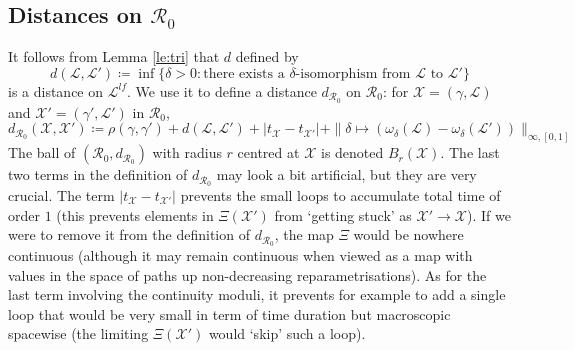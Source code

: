 \documentclass[11pt]{article}
\def\Conf{{\mathscr{R}}}
\def\Att{{\Xi}}
\begin{document}
\subsection{Distances on \texorpdfstring{$\Conf_0$}{R0}}
\label{sub:d}
It follows from Lemma \ref{le:tri} that $d$ defined by
\begin{equation}
 \label{eq:def:dist}
d( \mathcal{L},\mathcal{L}'  )\coloneqq
\inf \{\delta>0: \mbox{there exists a $\delta$-isomorphism from $\mathcal{L}$ to $\mathcal{L}'$}\}
\end{equation}
is a distance on $\mathscr{L}^{lf}$.
%
We use it to define a distance $d_{\Conf_0}$ on $\Conf_0$: for $\mathcal{X}=(\gamma, \mathcal{L})$ and $\mathcal{X}'=(\gamma', \mathcal{L}')$ in $\Conf_0$,
\[
d_{\Conf_0}(\mathcal{X},\mathcal{X}' )\coloneqq \rho(\gamma,\gamma')+
d( \mathcal{L},\mathcal{L}'  )+|t_{\mathcal{X}}-t_{\mathcal{X}'} |+\| \delta\mapsto (\omega_\delta(\mathcal{L})-\omega_ \delta(\mathcal{L}'))\|_{\infty,[0,1]}
\]
The ball of $(\Conf_0,d_{\Conf_0})$ with radius $r$ centred at $\mathcal{X}$ is denoted $B_r(\mathcal{X})$.
The last two terms in the definition of $d_{\Conf_0}$ may look a bit artificial, but they are very crucial. The term $|t_{\mathcal{X}}-t_{\mathcal{X}'} |$ prevents the small loops to accumulate total time of order $1$ (this prevents elements in $\Att(\mathcal{X}')$ from `getting stuck' as $\mathcal{X}'\to \mathcal{X}$). If we were to remove it from the definition of $d_{\Conf_0}$, the map $\Att$ would be nowhere continuous (although it may remain continuous when viewed as a map with values in the space of paths up non-decreasing reparametrisations). As for the last term involving the continuity moduli, it prevents for example to add a single loop that would be very small in term of time duration but macroscopic spacewise (the limiting $\Att(\mathcal{X}')$ would `skip' such a loop).
\end{document}
